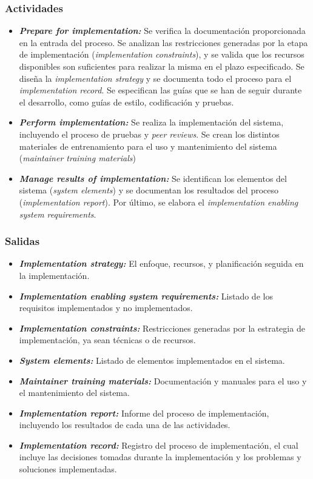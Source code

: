 \subsubsection{Actividades}
\begin{itemize}
  \item \textbf{\textit{Prepare for implementation:}} Se verifica la documentación proporcionada en la entrada del proceso. Se analizan las restricciones generadas por la etapa de implementación (\textit{implementation constraints}), y se valida que los recursos disponibles son suficientes para realizar la misma en el plazo especificado. Se diseña la \textit{implementation strategy} y se documenta todo el proceso para el \textit{implementation record}. Se especifican las guías que se han de seguir durante el desarrollo, como guías de estilo, codificación y pruebas.
  \item \textbf{\textit{Perform implementation:}} Se realiza la implementación del sistema, incluyendo el proceso de pruebas y \textit{peer reviews}. Se crean los distintos materiales de entrenamiento para el uso y mantenimiento del sistema (\textit{maintainer training materials})
  \item \textbf{\textit{Manage results of implementation:}} Se identifican los elementos del sistema (\textit{system elements}) y se documentan los resultados del proceso (\textit{implementation report}). Por último, se elabora el \textit{implementation enabling system requirements}.
\end{itemize}

\subsubsection{Salidas}
\begin{itemize}
  \item \textbf{\textit{Implementation strategy:}} El enfoque, recursos, y planificación seguida en la implementación.
  \item \textbf{\textit{Implementation enabling system requirements:}} Listado de los requisitos implementados y no implementados.
  \item \textbf{\textit{Implementation constraints:}} Restricciones generadas por la estrategia de implementación, ya sean técnicas o de recursos.
  \item \textbf{\textit{System elements:}} Listado de elementos implementados en el sistema.
  \item \textbf{\textit{Maintainer training materials:}} Documentación y manuales para el uso y el mantenimiento del sistema.
  \item \textbf{\textit{Implementation report:}} Informe del proceso de implementación, incluyendo los resultados de cada una de las actividades.
  \item \textbf{\textit{Implementation record:}} Registro del proceso de implementación, el cual incluye las decisiones tomadas durante la implementación y los problemas y soluciones implementadas.
\end{itemize}


